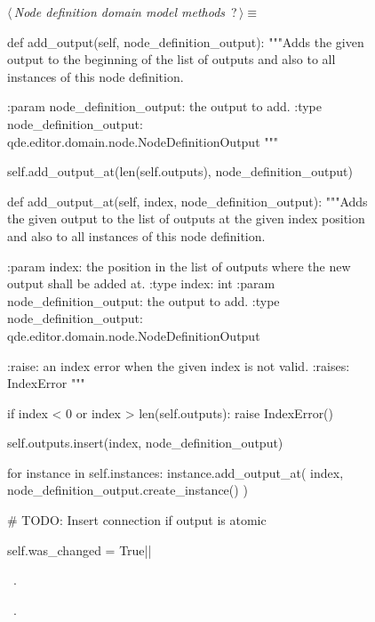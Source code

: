 \documentclass[%
    a4paper,    %
    justified,  %
    nobib,      %
    openany     %
]{tufte-book}
\begin{document}
\begin{figure}
\begin{flushleft} \small
\begin{minipage}{\linewidth}\label{scrap143}\raggedright\small
{} $\langle\,${\itshape Node definition domain model methods}\nobreak\ {\footnotesize {?}}$\,\rangle\equiv$
\vspace{-1ex}
\begin{pythoncode}
def add_output(self, node_definition_output):
    """Adds the given output to the beginning of the list of outputs and
    also to all instances of this node definition.

    :param node_definition_output: the output to add.
    :type  node_definition_output: qde.editor.domain.node.NodeDefinitionOutput
    """

    self.add_output_at(len(self.outputs), node_definition_output)

def add_output_at(self, index, node_definition_output):
    """Adds the given output to the list of outputs at the given index
    position and also to all instances of this node definition.

    :param index: the position in the list of outputs where the new output
                  shall be added at.
    :type  index: int
    :param node_definition_output: the output to add.
    :type  node_definition_output: qde.editor.domain.node.NodeDefinitionOutput

    :raise: an index error when the given index is not valid.
    :raises: IndexError
    """

    if index < 0 or index > len(self.outputs):
        raise IndexError()

    self.outputs.insert(index, node_definition_output)

    for instance in self.instances:
        instance.add_output_at(
            index,
            node_definition_output.create_instance()
        )

    # TODO: Insert connection if output is atomic

    self.was_changed = True|\NWsep|
\end{pythoncode}
\vspace{1.5ex}
\footnotesize
\begin{list}{}{\setlength{\itemsep}{-\parsep}\setlength{\itemindent}{-\leftmargin}}
\item \NWtxtMacroDefBy\ .
\item \NWtxtMacroRefIn\ .


\end{list}
\end{minipage}
\end{flushleft}
\end{figure}
\end{document}
